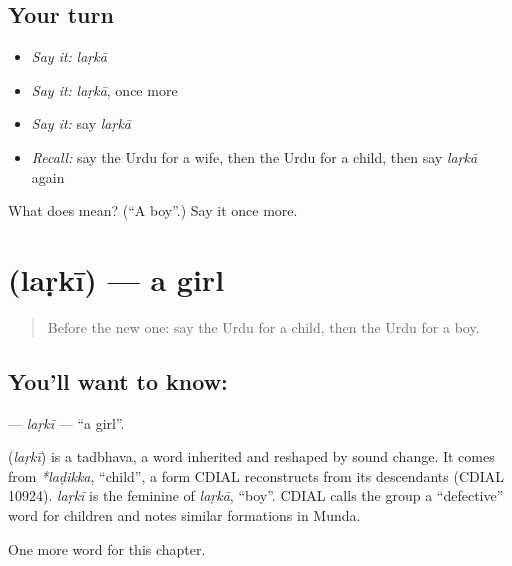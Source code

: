 \subsection*{Your turn}
\begin{itemize}
\raggedright
  \item \emph{Say it:} \emph{laṛkā}
  \item \emph{Say it:} \emph{laṛkā}, once more
  \item \emph{Say it:} say \emph{laṛkā}
  \item \emph{Recall:} say the Urdu for a wife, then the Urdu for a child, then say \emph{laṛkā} again
\end{itemize}

\begin{tcolorbox}[breakable,colback=teal!4,colframe=teal!35!black,title={Before you move on}]
What does  mean? (\textquotedblleft{}A boy\textquotedblright{}.) Say it once more.
\end{tcolorbox}
\section[\texorpdfstring{\ur{لڑکی} (laṛkī)}{لڑکی (laṛkī)}]{ (laṛkī) — a girl}

\label{lesson:UR-C45-larki}



\begin{quote}
Before the new one: say the Urdu for a child, then the Urdu for a boy.
\end{quote}

\subsection*{You'll want to know: }
\textbf{} — \emph{laṛkī} — \textquotedblleft{}a girl\textquotedblright{}.

\begin{cousinweb}
\textbf{} (\emph{laṛkī}) is a tadbhava, a word inherited and reshaped by sound change. It comes from \emph{*laḍikka}, \textquotedblleft{}child\textquotedblright{}, a form CDIAL reconstructs from its descendants (CDIAL 10924). \emph{laṛkī} is the feminine of \emph{laṛkā}, \textquotedblleft{}boy\textquotedblright{}. CDIAL calls the group a \textquotedblleft{}defective\textquotedblright{} word for children and notes similar formations in Munda.
\end{cousinweb}

\begin{grammarlens}[title={What you've built}]
One more word for this chapter.
\end{grammarlens}

